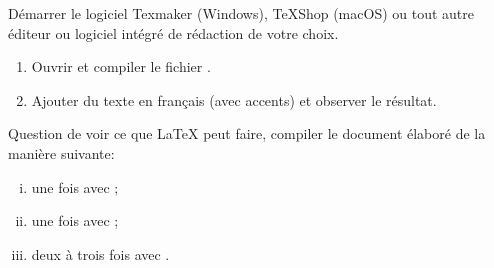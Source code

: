 \begin{exercice}
  Démarrer le logiciel \alert{Texmaker} (Windows), \alert{TeXShop}
  (macOS) ou tout autre éditeur ou logiciel intégré de rédaction de
  votre choix.

  \begin{enumerate}
  \item Ouvrir et compiler le fichier .
  \item Ajouter du texte en français (avec accents) et observer le
    résultat.
  \end{enumerate}
\end{exercice}

\begin{exercice}
  Question de voir ce que {\LaTeX} peut faire, compiler le document
  élaboré  de la manière suivante:
  \begin{enumerate}[i)]
  \item une fois avec ;
  \item une fois avec ;
  \item deux à trois fois avec .
  \end{enumerate}
\end{exercice}

